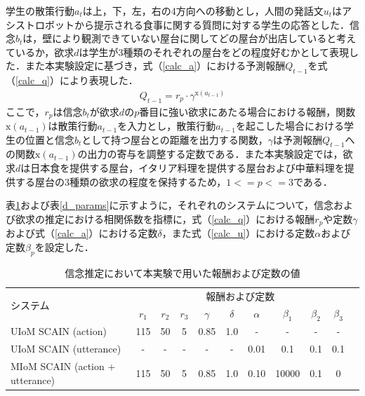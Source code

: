 \par
学生の散策行動$a_t$は上，下，左，右の4方向への移動とし，人間の発話文$u_t$はアシストロボットから提示される食事に関する質問に対する学生の応答とした．信念$b_t$は，壁により観測できていない屋台に関してどの屋台が出店していると考えているか，欲求$d$は学生が3種類のそれぞれの屋台をどの程度好むかとして表現した．また本実験設定に基づき，式（\ref{calc_a}）における予測報酬$Q_{t-1}$を式（\ref{calc_q}）により表現した．
\begin{equation}
  \begin{split}
  \label{calc_q}
  Q_{t-1}=r_p\cdot \gamma^{\mathrm{x}(a_{t-1})}
  \end{split}
\end{equation}
ここで，$r_p$は信念$b_{t}$が欲求$d$の$p$番目に強い欲求にあたる場合における報酬，関数$\mathrm{x}(a_{t-1})$は散策行動$a_{t-1}$を入力とし，散策行動$a_{t-1}$を起こした場合における学生の位置と信念$b_{t}$として持つ屋台との距離を出力する関数，$\gamma$は予測報酬$Q_{t-1}$への関数$\mathrm{x}(a_{t-1})$の出力の寄与を調整する定数である．また本実験設定では，欲求$d$は日本食を提供する屋台，イタリア料理を提供する屋台および中華料理を提供する屋台の3種類の欲求の程度を保持するため，$1<=p<=3$である．
\par
表\ref{b_params}および表\ref{d_params}に示すように，それぞれのシステムについて，信念および欲求の推定における相関係数を指標に，式（\ref{calc_q}）における報酬$r_p$や定数$\gamma$および式（\ref{calc_a}）における定数$\delta$，また式（\ref{calc_u}）における定数$\alpha$および定数$\beta_p$を設定した．
\begin{table}[htb]
  \begin{center}
  \caption{信念推定において本実験で用いた報酬および定数の値}
  \label{b_params}
  \begin{tabular}{lcccccccccc} \hline
    \multirow{2}{*}{システム}&\multicolumn{9}{c}{報酬および定数}\\\cline{2-10}
    & $r_1$& $r_2$&$r_3$&$\gamma$&$\delta$&$\alpha$&$\beta_1$&$\beta_2$&$\beta_3$\\ \hline
    UIoM SCAIN (action)&115&50&5&0.85&1.0&-&-&-&-\\
    UIoM SCAIN (utterance)&-&-&-&-&-&0.01&0.1&0.1&0.1\\
    MIoM SCAIN (action + utterance)&115&50&5&0.85&1.0&0.10&10000&0.1&0\\\hline
  \end{tabular}
\end{center}
\end{table}

